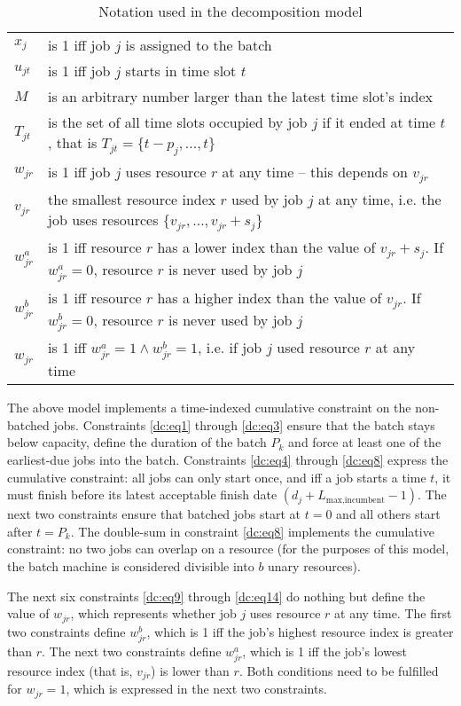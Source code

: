 \documentclass[13pt, letterpaper, twoside]{book}
\begin{document}
\begin{table}
\begin{tabular}{l p{5in}}
$x_j$ & is 1 iff job $j$ is assigned to the batch \\
$u_{jt}$ & is 1 iff job $j$ starts in time slot $t$ \\
$M$  & is an arbitrary number larger than the latest time slot's index \\
$T_{jt}$ & is the set of all time slots occupied by job $j$ if it ended at time
$t$, that is $T_{jt} = \{t - p_j, \dots, t\}$ \\
$w_{jr}$ & is 1 iff job $j$ uses resource $r$ at any time -- this depends on
$v_{jr}$ \\
$v_{jr}$ & the smallest resource index $r$ used by job $j$ at any time, i.e. the
job uses resources $\{v_{jr},\dots,v_{jr}+s_j\}$ \\
$w^a_{jr}$ & is 1 iff resource $r$ has a lower index than the value of
$v_{jr}+s_j$. If $w^a_{jr} = 0$, resource $r$ is never used by job $j$ \\
$w^b_{jr}$ & is 1 iff resource $r$ has a higher index than the value of
$v_{jr}$. If $w^b_{jr} = 0$, resource $r$ is never used by job $j$ \\
$w_{jr}$ & is 1 iff $w^a_{jr} = 1 \land w^b_{jr} = 1$, i.e. if job $j$ used
resource $r$ at any time
\end{tabular}
\caption{Notation used in the decomposition model}
\end{table}

The above model implements a time-indexed cumulative constraint on the
non-batched jobs. Constraints \ref{dc:eq1} through \ref{dc:eq3} ensure that the
batch stays below capacity, define the duration of the batch $P_k$ and force at
least one of the earliest-due jobs into the batch. Constraints \ref{dc:eq4}
through \ref{dc:eq8} express the cumulative constraint: all jobs can only start
once, and iff a job starts a time $t$, it must finish before its latest
acceptable finish date $(d_j + L_{\text{max,incumbent}} - 1)$. The next two
constraints ensure that batched jobs start at $t = 0$ and all others start after
$t = P_k$. The double-sum in constraint \ref{dc:eq8} implements the cumulative
constraint: no two jobs can overlap on a resource (for the purposes of this
model, the batch machine is considered divisible into $b$ unary resources).

The next six constraints \ref{dc:eq9} through \ref{dc:eq14} do nothing but
define the value of $w_{jr}$, which represents whether job $j$ uses resource $r$
at any time. The first two constraints define $w^b_{jr}$, which is 1 iff the
job's highest resource index is greater than $r$. The next two constraints
define $w^a_{jr}$, which is 1 iff the job's lowest resource index (that is,
$v_{jr}$) is lower than $r$. Both conditions need to be fulfilled for $w_{jr} =
1$, which is expressed in the next two constraints.
\end{document}

